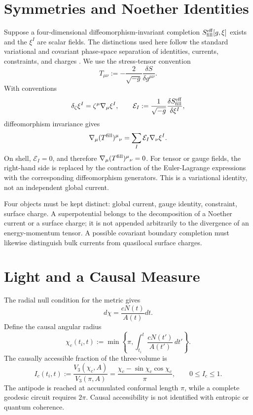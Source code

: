 \documentclass[11pt,a4paper]{article}
\def\dd{d}%
\numberwithin{equation}{section}
\theoremstyle{remark}
\newcommand{\dd}{\mathrm{d}}
\begin{document}
\section{Symmetries and Noether Identities}
Suppose a four-dimensional diffeomorphism-invariant completion \(S^{\rm eff}_{\rm fill}[g,\xi]\) exists and the \(\xi^I\) are scalar fields. The distinctions used here follow the standard variational and covariant phase-space separation of identities, currents, constraints, and charges \cite{Noether1918,LeeWald1990,IyerWald1994,BarnichBrandt2002}. We use the stress-tensor convention
\begin{equation}
T_{\mu\nu}:=-\frac{2}{\sqrt{-g}}\frac{\delta S}{\delta g^{\mu\nu}}.
\end{equation}
With conventions
\begin{equation}
\delta_\zeta \xi^I=\zeta^\mu\nabla_\mu\xi^I,
\qquad
\mathcal{E}_I:=\frac{1}{\sqrt{-g}}\frac{\delta S^{\rm eff}_{\rm fill}}{\delta\xi^I},
\end{equation}
diffeomorphism invariance gives
\begin{equation}
\nabla_\mu(T^{\rm fill})^{\mu}{}_{\nu}=\sum_I\mathcal{E}_I\nabla_\nu\xi^I.
\end{equation}
On shell, \(\mathcal{E}_I=0\), and therefore \(\nabla_\mu(T^{\rm fill})^\mu{}_{\nu}=0\). For tensor or gauge fields, the right-hand side is replaced by the contraction of the Euler-Lagrange expressions with the corresponding diffeomorphism generators. This is a variational identity, not an independent global current.

Four objects must be kept distinct: global current, gauge identity, constraint, surface charge. A superpotential belongs to the decomposition of a Noether current or a surface charge; it is not appended arbitrarily to the divergence of an energy-momentum tensor. A possible covariant boundary completion must likewise distinguish bulk currents from quasilocal surface charges.

\section{Light and a Causal Measure}
The radial null condition for the metric gives
\begin{equation}
\dd\chi=\frac{cN(t)}{A(t)}\dd t.
\end{equation}
Define the causal angular radius
\begin{equation}
\chi_c(t_i,t):=\min\left\{\pi,\int_{t_i}^t\frac{cN(t')}{A(t')}\,\dd t'\right\}.
\end{equation}
The causally accessible fraction of the three-volume is
\begin{equation}
I_c(t_i,t):=\frac{V_3(\chi_c,A)}{V_3(\pi,A)}
=\frac{\chi_c-\sin\chi_c\cos\chi_c}{\pi},
\qquad
0\le I_c\le1.
\end{equation}
The antipode is reached at accumulated conformal length \(\pi\), while a complete geodesic circuit requires \(2\pi\). Causal accessibility is not identified with entropic or quantum coherence.
\end{document}
